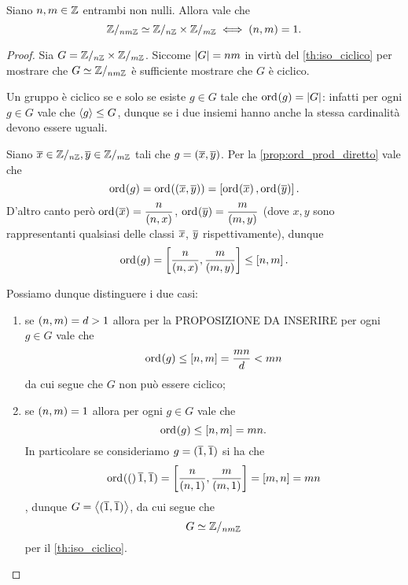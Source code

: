 \begin{theorem}
     \label{th:cinese_III}
    Siano $n, m \in \Z$ entrambi non nulli. Allora vale che \[
        \Zmod{nm} \isomorph \Zmod{n}\times \Zmod{m} \iff \mcd{n}{m} = 1.
    \]
\end{theorem}
\begin{proof}
    Sia $G = \Zmod n \times \Zmod m$. Siccome $\abs*{G} = nm$ in virtù del \autoref{th:iso_ciclico} per mostrare che $G \isomorph \Zmod{nm}$ è sufficiente mostrare che $G$ è ciclico.

    Un gruppo è ciclico se e solo se esiste $g \in G$ tale che $\ord{g} = \abs G$: infatti per ogni $g \in G$ vale che $\cycl*{g} \leq G$, dunque se i due insiemi hanno anche la stessa cardinalità devono essere uguali.

    Siano $\eqclass x \in \Zmod n, \eqclass y \in \Zmod m$ tali che $g = (\eqclass x, \eqclass y)$. Per la \autoref{prop:ord_prod_diretto} vale che \[
        \ord{g} = \ord{(\eqclass x, \eqclass y)} = \mcm{\ord{\eqclass x}}{\ord{\eqclass y}}.    
    \]
    D'altro canto però $\ord{\eqclass x} = \dfrac{n}{\mcd{n}{x}}$, $\ord{\eqclass y} = \dfrac{m}{\mcd{m}{y}}$ (dove $x, y$ sono rappresentanti qualsiasi delle classi $\eqclass x$, $\eqclass y$ rispettivamente), dunque \[
        \ord g = \mcm{\dfrac{n}{\mcd{n}{x}}}{\dfrac{m}{\mcd{m}{y}}} \leq \mcm{n}{m}. 
    \]

    Possiamo dunque distinguere i due casi: \begin{enumerate}
        \item se $\mcd{n}{m} = d > 1$ allora per la PROPOSIZIONE DA INSERIRE per ogni $g \in G$ vale che \[
            \ord g \leq \mcm{n}{m} = \frac{mn}{d} < mn    
        \] da cui segue che $G$ non può essere ciclico;
        \item se $\mcd{n}{m} = 1$ allora per ogni $g \in G$ vale che \[
            \ord g \leq \mcm{n}{m} = mn.    
        \] In particolare se consideriamo $g = (\eqclass 1, \eqclass 1)$ si ha che \[
            \ord(\eqclass 1, \eqclass 1) = \mcm{\frac{n}{\mcd{n}{1}}}{\frac{m}{\mcd{m}{1}}} = \mcm{m}{n} = mn  
        \], dunque $G = \cycl*{(\eqclass 1, \eqclass 1)}$, da cui segue che \[
            G \isomorph \Zmod{nm}    
        \] per il \autoref{th:iso_ciclico}. \qedhere
    \end{enumerate} 
\end{proof}

